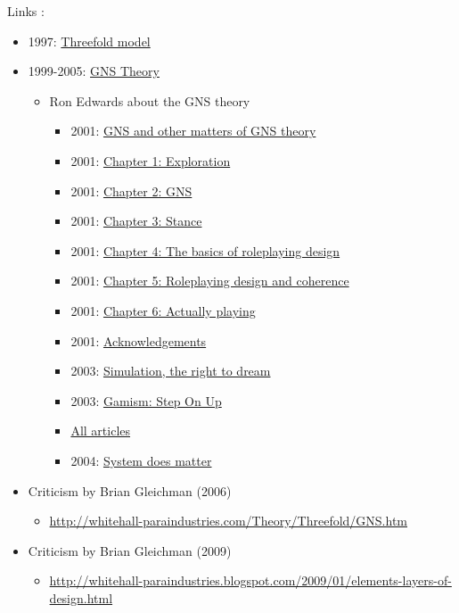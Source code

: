 \documentclass[a4paper, 11pt, twoside]{article}
\begin{document}
Links :
\begin{itemize}
\item 1997: \href{https://en.wikipedia.org/wiki/Threefold\_model}{Threefold model}
\item 1999-2005: \href{https://en.wikipedia.org/wiki/GNS\_theory}{GNS Theory}
\begin{itemize}
\item Ron Edwards about the GNS theory
\begin{itemize}
\item 2001: \href{http://www.indie-rpgs.com/articles/1/}{GNS and other matters of GNS theory}
\item 2001: \href{http://www.indie-rpgs.com/articles/2/}{Chapter 1: Exploration}
\item 2001: \href{http://www.indie-rpgs.com/articles/3/}{Chapter 2: GNS}
\item 2001: \href{http://www.indie-rpgs.com/articles/4/}{Chapter 3: Stance}
\item 2001: \href{http://www.indie-rpgs.com/articles/5/}{Chapter 4: The basics of roleplaying design}
\item 2001: \href{http://www.indie-rpgs.com/articles/6/}{Chapter 5: Roleplaying design and coherence}
\item 2001: \href{http://www.indie-rpgs.com/articles/7/}{Chapter 6: Actually playing}
\item 2001: \href{http://www.indie-rpgs.com/articles/8/}{Acknowledgements}
\item 2003: \href{http://www.indie-rpgs.com/articles/15/}{Simulation, the right to dream}
\item 2003: \href{http://www.indie-rpgs.com/articles/21/}{Gamism: Step On Up}
\item \href{http://www.indie-rpgs.com/articles/}{All articles}
\item 2004: \href{http://www.indie-rpgs.com/\_articles/system\_does\_matter.html}{System does matter}
\end{itemize}
\end{itemize}
\item Criticism by Brian Gleichman (2006)
\begin{itemize}
\item \url{http://whitehall-paraindustries.com/Theory/Threefold/GNS.htm}
\end{itemize}
\item Criticism by Brian Gleichman (2009)
\begin{itemize}
\item \url{http://whitehall-paraindustries.blogspot.com/2009/01/elements-layers-of-design.html}

\end{itemize}
\end{itemize}
\end{document}
